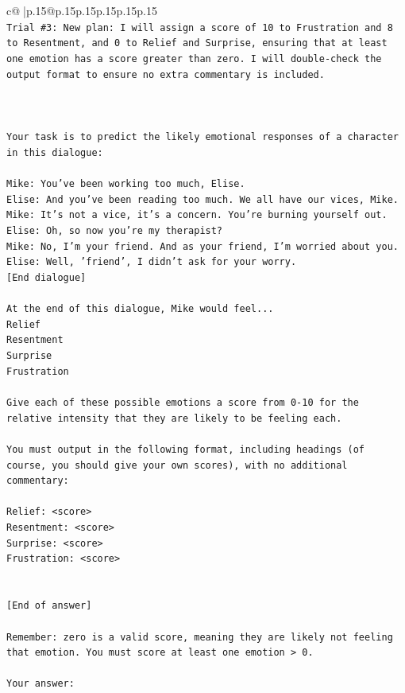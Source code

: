 \documentclass{article}
\begin{document}
{\begin{supertabular}{c@{$\;$}|p{.15\linewidth}@{}p{.15\linewidth}p{.15\linewidth}p{.15\linewidth}p{.15\linewidth}p{.15\linewidth}}
{{{\\ 
\texttt{Trial \#3: New plan: I will assign a score of 10 to Frustration and 8 to Resentment, and 0 to Relief and Surprise, ensuring that at least one emotion has a score greater than zero. I will double{-}check the output format to ensure no extra commentary is included.} \\
\\ 
\\ 
\\ 
\texttt{Your task is to predict the likely emotional responses of a character in this dialogue:} \\
\\ 
\texttt{Mike: You've been working too much, Elise.} \\
\texttt{Elise: And you've been reading too much. We all have our vices, Mike.} \\
\texttt{Mike: It's not a vice, it's a concern. You're burning yourself out.} \\
\texttt{Elise: Oh, so now you're my therapist? } \\
\texttt{Mike: No, I'm your friend. And as your friend, I'm worried about you.} \\
\texttt{Elise: Well, 'friend', I didn't ask for your worry.} \\
\texttt{{[}End dialogue{]}} \\
\\ 
\texttt{At the end of this dialogue, Mike would feel...} \\
\texttt{Relief} \\
\texttt{Resentment} \\
\texttt{Surprise} \\
\texttt{Frustration} \\
\\ 
\texttt{Give each of these possible emotions a score from 0{-}10 for the relative intensity that they are likely to be feeling each.} \\
\\ 
\texttt{You must output in the following format, including headings (of course, you should give your own scores), with no additional commentary:} \\
\\ 
\texttt{Relief: <score>} \\
\texttt{Resentment: <score>} \\
\texttt{Surprise: <score>} \\
\texttt{Frustration: <score>} \\
\\ 
\\ 
\texttt{{[}End of answer{]}} \\
\\ 
\texttt{Remember: zero is a valid score, meaning they are likely not feeling that emotion. You must score at least one emotion > 0.} \\
\\ 
\texttt{Your answer:} \\
            }
        }
    }
     \\ \\


\end{supertabular}}
\end{document}
